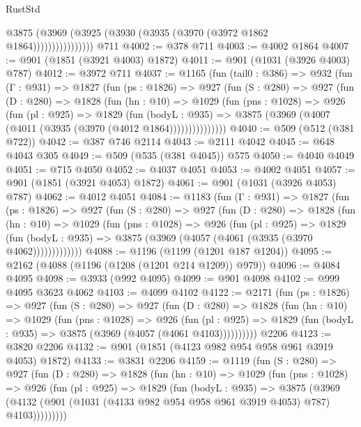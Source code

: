 \begin{lexlean}{RustStd}
\begin{coremodule}
{\begin{coremodule}
{{{{{{{{{{{{{{                      @3875 (@3969 (@3925 (@3930 (@3935 (@3970 (@3972 @1862 @1864))))))))))))))))
    @711
@4002 := @378 @711
@4003 := @4002 @1864
@4007 := @901 (@1851 (@3921 @4003) @1872)
@4011 := @901 (@1031 (@3926 @4003) @787)
@4012 := @3972 @711
@4037 := @1165
    (fun (tail0 : @386) =>
    @932
      (fun (Γ : @931) =>
      @1827
        (fun (ps : @1826) =>
        @927
          (fun (S : @280) =>
          @927
            (fun (D : @280) =>
            @1828
              (fun (hn : @10) =>
              @1029
                (fun (pns : @1028) =>
                @926
                  (fun (pl : @925) =>
                  @1829
                    (fun (bodyL : @935) =>
                    @3875 (@3969 (@4007 (@4011 (@3935 (@3970 (@4012 @1864)))))))))))))))
@4040 := @509 (@512 (@381 @722))
@4042 := @387 @746 @2114
@4043 := @2111 @4042
@4045 := @648 @4043 @305
@4049 := @509 (@535 (@381 @4045)) @575
@4050 := @4040 @4049
@4051 := @715 @4050
@4052 := @4037 @4051
@4053 := @4002 @4051
@4057 := @901 (@1851 (@3921 @4053) @1872)
@4061 := @901 (@1031 (@3926 @4053) @787)
@4062 := @4012 @4051
@4084 := @1183
    (fun (Γ : @931) =>
    @1827
      (fun (ps : @1826) =>
      @927
        (fun (S : @280) =>
        @927
          (fun (D : @280) =>
          @1828
            (fun (hn : @10) =>
            @1029
              (fun (pns : @1028) =>
              @926
                (fun (pl : @925) =>
                @1829
                  (fun (bodyL : @935) => @3875 (@3969 (@4057 (@4061 (@3935 (@3970 @4062)))))))))))))
@4088 := @1196 (@1199 (@1201 @187 @1204))
@4095 := @2162 (@4088 (@1196 (@1208 (@1201 @214 @1209)) @979))
@4096 := @4084 @4095
@4098 := @3933 (@992 @4095)
@4099 := @901 @4098
@4102 := @999 @4095 @3623 @4062
@4103 := @4099 @4102
@4122 := @2171
    (fun (ps : @1826) =>
    @927
      (fun (S : @280) =>
      @927
        (fun (D : @280) =>
        @1828
          (fun (hn : @10) =>
          @1029
            (fun (pns : @1028) =>
            @926
              (fun (pl : @925) =>
              @1829 (fun (bodyL : @935) => @3875 (@3969 (@4057 (@4061 @4103))))))))))
    @2206
@4123 := @3820 @2206
@4132 := @901 (@1851 (@4123 @982 @954 @958 @961 @3919 @4053) @1872)
@4133 := @3831 @2206
@4159 := @1119
    (fun (S : @280) =>
    @927
      (fun (D : @280) =>
      @1828
        (fun (hn : @10) =>
        @1029
          (fun (pns : @1028) =>
          @926
            (fun (pl : @925) =>
            @1829
              (fun (bodyL : @935) =>
              @3875
                (@3969
                  (@4132 (@901 (@1031 (@4133 @982 @954 @958 @961 @3919 @4053) @787) @4103)))))))))
}}}}}}}}}}}}}}
\end{coremodule}}
\end{coremodule}
\end{lexlean}

